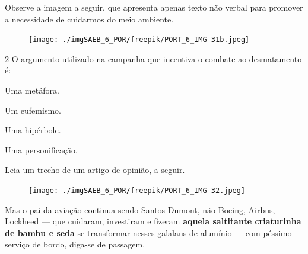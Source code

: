 Observe a imagem a seguir, que apresenta apenas texto não verbal
para promover a necessidade de cuidarmos do meio ambiente.

\begin{figure}[H]
\centering\texttt{[image: ./imgSAEB\_6\_POR/freepik/PORT\_6\_IMG-31b.jpeg]}
\end{figure}

\num{2} O argumento utilizado na campanha que incentiva o combate ao
desmatamento é:

\begin{multicols}{2}
\begin{escolha}
\item Uma metáfora.
\item Um eufemismo.
\item Uma hipérbole.
\item Uma personificação.
\end{escolha}
\end{multicols}



Leia um trecho de um artigo de opinião, a seguir.

\begin{myquote}
\begin{figure}
\centering\texttt{[image: ./imgSAEB\_6\_POR/freepik/PORT\_6\_IMG-32.jpeg]}
\end{figure}

Mas o pai da aviação continua sendo Santos Dumont, não Boeing, Airbus,
Lockheed — que cuidaram, investiram e fizeram \textbf{aquela
saltitante criaturinha de bambu e seda} se transformar nesses galalaus
de alumínio — com péssimo serviço de bordo, diga-se de passagem.

\end{myquote}

